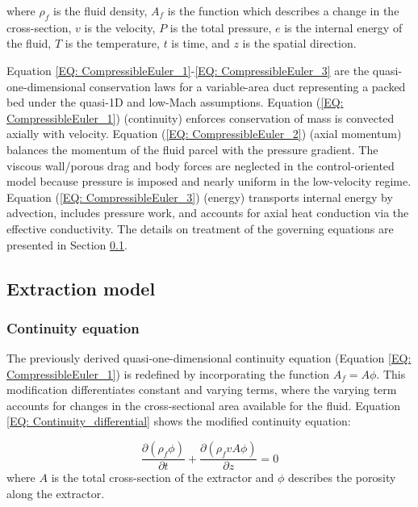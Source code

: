 \documentclass[a4paper,fleqn]{cas-dc}
\begin{document}
where $\rho_f$ is the fluid density, $A_f$ is the function which describes a change in the cross-section, $v$ is the velocity, $P$ is the total pressure, $e$ is the internal energy of the fluid, $T$ is the temperature, $t$ is time, and $z$ is the spatial direction.

Equation \ref{EQ: CompressibleEuler_1}-\ref{EQ: CompressibleEuler_3} are the quasi-one-dimensional conservation laws for a variable-area duct representing a packed bed under the quasi-1D and low-Mach assumptions. Equation (\ref{EQ: CompressibleEuler_1}) (continuity) enforces conservation of mass is convected axially with velocity. Equation (\ref{EQ: CompressibleEuler_2}) (axial momentum) balances the momentum of the fluid parcel with the pressure gradient. The viscous wall/porous drag and body forces are neglected in the control-oriented model because pressure is imposed and nearly uniform in the low-velocity regime. Equation (\ref{EQ: CompressibleEuler_3}) (energy) transports internal energy by advection, includes pressure work, and accounts for axial heat conduction via the effective conductivity. The details on treatment of the governing equations are presented in Section \ref{CH: Extraction_model}.

\subsection{Extraction model} \label{CH: Extraction_model}
\subsubsection{Continuity equation} \label{CH: Continuity}

The previously derived quasi-one-dimensional continuity equation (Equation \ref{EQ: CompressibleEuler_1}) is redefined by incorporating the function $A_f = A\phi$. This modification differentiates constant and varying terms, where the varying term accounts for changes in the cross-sectional area available for the fluid. Equation \ref{EQ: Continuity_differential} shows the modified continuity equation:

{\footnotesize
	\begin{equation} \label{EQ: Continuity_differential}
		\frac{\partial (\rho_f \phi)}{\partial t} + \frac{\partial (\rho_f v A\phi)}{\partial z} = 0
	\end{equation}
}
where $A$ is the total cross-section of the extractor and $\phi$ describes the porosity along the extractor.
\end{document}
